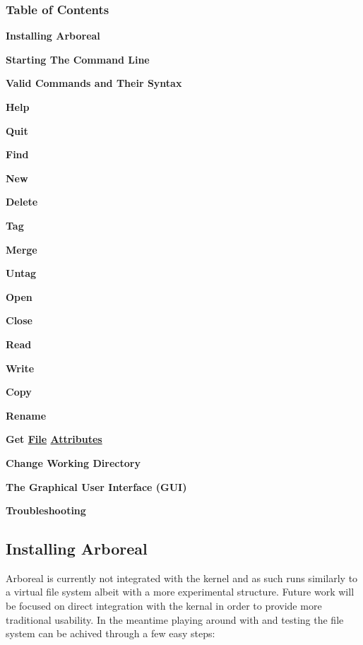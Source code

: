 \subsubsection*{Table of Contents}


\begin{DoxyItemize}
\item {\bfseries Installing Arboreal}
\item {\bfseries Starting The Command Line}
\item {\bfseries Valid Commands and Their Syntax}
\begin{DoxyItemize}
\item {\bfseries Help}
\item {\bfseries Quit}
\item {\bfseries Find}
\item {\bfseries New}
\item {\bfseries Delete}
\item {\bfseries Tag}
\item {\bfseries Merge}
\item {\bfseries Untag}
\item {\bfseries Open}
\item {\bfseries Close}
\item {\bfseries Read}
\item {\bfseries Write}
\item {\bfseries Copy}
\item {\bfseries Rename}
\item {\bfseries Get \mbox{\hyperlink{classFile}{File}} \mbox{\hyperlink{classAttributes}{Attributes}}}
\item {\bfseries Change Working Directory}
\end{DoxyItemize}
\item {\bfseries The Graphical User Interface (G\+UI)}
\item {\bfseries Troubleshooting} ~\newline

\end{DoxyItemize}

\subsection*{Installing Arboreal}

Arboreal is currently not integrated with the kernel and as such runs similarly to a virtual file system albeit with a more experimental structure. Future work will be focused on direct integration with the kernal in order to provide more traditional usability. In the meantime playing around with and testing the file system can be achived through a few easy steps\+: ~\newline

